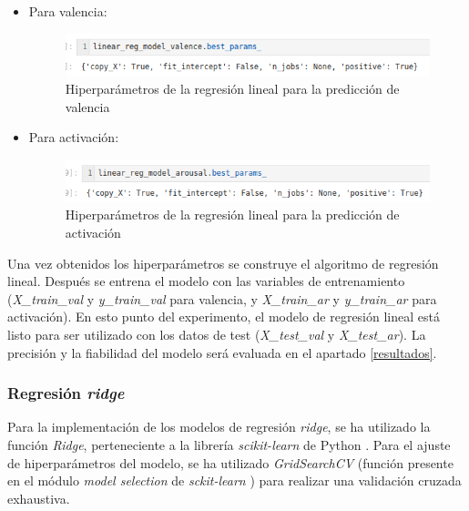 \documentclass[12pt,a4paper,Spanish]{article}
\begin{document}
\begin{itemize}
	\item Para valencia:
	\begin{figure}[H]
		\centering
		\includegraphics[width=0.7\linewidth]{figs/final_params_linear_valence}
		\caption{Hiperparámetros de la regresión lineal para la predicción de valencia}
		\label{fig:finalparamslinearvalence}
	\end{figure}
	\item Para activación:
	\begin{figure}[H]
		\centering
		\includegraphics[width=0.7\linewidth]{figs/final_params_linear_arousal}
		\caption{Hiperparámetros de la regresión lineal para la predicción de activación}
		\label{fig:finalparamslineararousal}
	\end{figure}
\end{itemize}
Una vez obtenidos los hiperparámetros se construye el algoritmo de regresión lineal. Después se entrena el modelo con las variables de entrenamiento (\textit{X\_train\_val} y \textit{y\_train\_val} para valencia, y \textit{X\_train\_ar} y \textit{y\_train\_ar} para activación).
\newline
En esto punto del experimento, el modelo de regresión lineal está listo para ser utilizado con los datos de test (\textit{X\_test\_val} y \textit{X\_test\_ar}). La precisión y la fiabilidad del modelo será evaluada en el apartado \ref{resultados}.

\subsubsection{Regresión \textit{ridge}}
Para la implementación de los modelos de regresión \textit{ridge}, se ha utilizado la función \textit{Ridge}, perteneciente a la librería \textit{scikit-learn} de Python \cite{scikit-learn}.
\newline
Para el ajuste de hiperparámetros del modelo, se ha utilizado \textit{GridSearchCV} (función presente en el módulo \textit{model selection} de \textit{sckit-learn} \cite{scikit-learn}) para realizar una validación cruzada exhaustiva.
\end{document}
